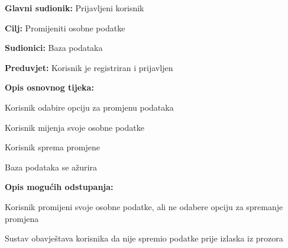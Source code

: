 					\noindent {}
					\begin{packed_item}
						
						\item \textbf{Glavni sudionik: } Prijavljeni korisnik
						\item  \textbf{Cilj:} Promijeniti osobne podatke
						\item  \textbf{Sudionici:} Baza podataka
						\item  \textbf{Preduvjet:} Korisnik je registriran i prijavljen
						\item  \textbf{Opis osnovnog tijeka:}
						
						\item[] \begin{packed_enum}
							
							\item Korisnik odabire opciju za promjenu podataka
							\item Korisnik mijenja svoje osobne podatke
							\item Korisnik sprema promjene
							\item Baza podataka se ažurira
						\end{packed_enum}
						
						\item  \textbf{Opis mogućih odstupanja:}
						
						\item[] \begin{packed_item}
							
							\item[2.a] Korisnik promijeni svoje osobne podatke, ali ne odabere opciju za spremanje promjena
							\item[] \begin{packed_enum}
								
								\item Sustav obavještava korisnika da nije spremio podatke prije izlaska iz prozora
								
							\end{packed_enum}
						\end{packed_item}
					\end{packed_item}
					
